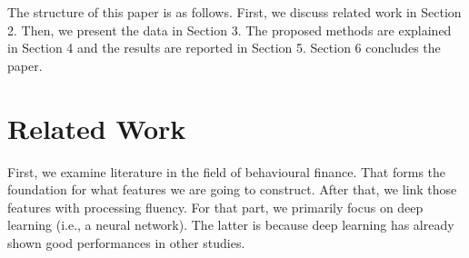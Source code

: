 \documentclass[11pt]{article}
\begin{document}
The structure of this paper is as follows. First, we discuss related work in Section 2. Then, we present the data in Section 3. The proposed methods are explained in Section 4 and the results are reported in Section 5. Section 6 concludes the paper.

















\newpage
\section{Related Work}
First, we examine literature in the field of behavioural finance. That forms the foundation for what features we are going to construct. After that, we link those features with processing fluency. For that part, we primarily focus on deep learning (i.e., a neural network). The latter is because deep learning has already shown good performances in other studies.
\end{document}
